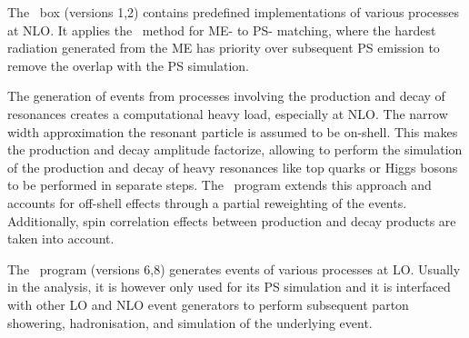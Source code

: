 The \Powheg\ box (versions 1,2) contains predefined implementations of various processes at NLO. It applies the \Powheg\ method for ME- to PS- matching, where the hardest radiation generated from the ME has priority over subsequent PS emission to remove the overlap with the PS simulation.

The generation of events from processes involving the production and decay of resonances creates a computational heavy load, especially at NLO. The narrow width approximation the resonant particle is assumed to be on-shell. This makes the production and decay amplitude factorize, allowing to perform the simulation of the production and decay of heavy resonances like top quarks or Higgs bosons to be performed in separate steps. The \MS\ program extends this approach and accounts for off-shell effects through a partial reweighting of the events. Additionally, spin correlation effects between production and decay products are taken into account. 

The \Pythia\ program (versions 6,8) generates events of various processes at LO. Usually in the analysis, it is however only used for its PS simulation and it is interfaced with other LO and NLO event generators to perform subsequent parton showering, hadronisation, and simulation of the underlying event. 

